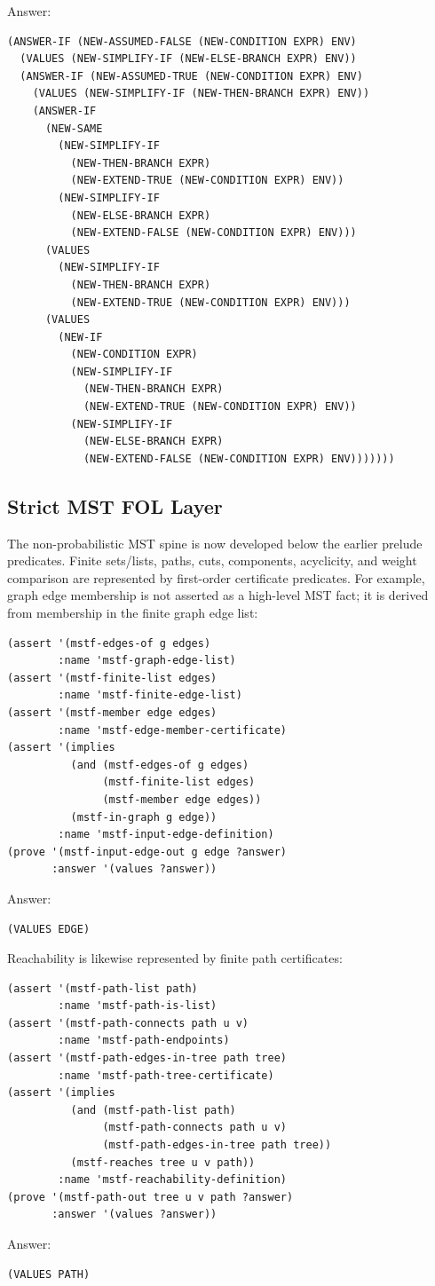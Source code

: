 \documentclass[runningheads]{llncs}
\begin{document}
Answer:
\begin{lstlisting}
(ANSWER-IF (NEW-ASSUMED-FALSE (NEW-CONDITION EXPR) ENV)
  (VALUES (NEW-SIMPLIFY-IF (NEW-ELSE-BRANCH EXPR) ENV))
  (ANSWER-IF (NEW-ASSUMED-TRUE (NEW-CONDITION EXPR) ENV)
    (VALUES (NEW-SIMPLIFY-IF (NEW-THEN-BRANCH EXPR) ENV))
    (ANSWER-IF
      (NEW-SAME
        (NEW-SIMPLIFY-IF
          (NEW-THEN-BRANCH EXPR)
          (NEW-EXTEND-TRUE (NEW-CONDITION EXPR) ENV))
        (NEW-SIMPLIFY-IF
          (NEW-ELSE-BRANCH EXPR)
          (NEW-EXTEND-FALSE (NEW-CONDITION EXPR) ENV)))
      (VALUES
        (NEW-SIMPLIFY-IF
          (NEW-THEN-BRANCH EXPR)
          (NEW-EXTEND-TRUE (NEW-CONDITION EXPR) ENV)))
      (VALUES
        (NEW-IF
          (NEW-CONDITION EXPR)
          (NEW-SIMPLIFY-IF
            (NEW-THEN-BRANCH EXPR)
            (NEW-EXTEND-TRUE (NEW-CONDITION EXPR) ENV))
          (NEW-SIMPLIFY-IF
            (NEW-ELSE-BRANCH EXPR)
            (NEW-EXTEND-FALSE (NEW-CONDITION EXPR) ENV)))))))
\end{lstlisting}

\subsection{Strict MST FOL Layer}

The non-probabilistic MST spine is now developed below the earlier prelude
predicates.  Finite sets/lists, paths, cuts, components, acyclicity, and weight
comparison are represented by first-order certificate predicates.  For example,
graph edge membership is not asserted as a high-level MST fact; it is derived
from membership in the finite graph edge list:
\begin{lstlisting}
(assert '(mstf-edges-of g edges)
        :name 'mstf-graph-edge-list)
(assert '(mstf-finite-list edges)
        :name 'mstf-finite-edge-list)
(assert '(mstf-member edge edges)
        :name 'mstf-edge-member-certificate)
(assert '(implies
          (and (mstf-edges-of g edges)
               (mstf-finite-list edges)
               (mstf-member edge edges))
          (mstf-in-graph g edge))
        :name 'mstf-input-edge-definition)
(prove '(mstf-input-edge-out g edge ?answer)
       :answer '(values ?answer))
\end{lstlisting}
Answer:
\begin{lstlisting}
(VALUES EDGE)
\end{lstlisting}

Reachability is likewise represented by finite path certificates:
\begin{lstlisting}
(assert '(mstf-path-list path)
        :name 'mstf-path-is-list)
(assert '(mstf-path-connects path u v)
        :name 'mstf-path-endpoints)
(assert '(mstf-path-edges-in-tree path tree)
        :name 'mstf-path-tree-certificate)
(assert '(implies
          (and (mstf-path-list path)
               (mstf-path-connects path u v)
               (mstf-path-edges-in-tree path tree))
          (mstf-reaches tree u v path))
        :name 'mstf-reachability-definition)
(prove '(mstf-path-out tree u v path ?answer)
       :answer '(values ?answer))
\end{lstlisting}
Answer:
\begin{lstlisting}
(VALUES PATH)
\end{lstlisting}
\end{document}
